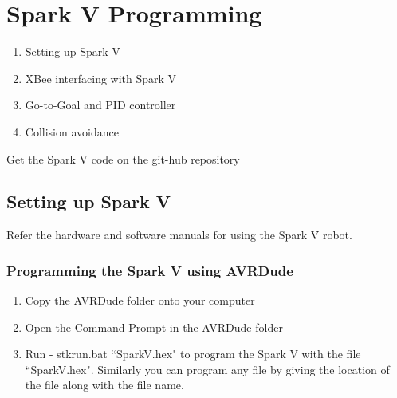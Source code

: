 \documentclass[main.tex]{subfiles}
\begin{document}
\chapter[Spark V Programming]{Spark V Programming}
	\begin{enumerate}
		\item Setting up Spark V
		\item XBee interfacing with Spark V
		\item Go-to-Goal and PID controller
		\item Collision avoidance
	\end{enumerate}

Get the Spark V code on the git-hub repository \href{https://github.com/eYSIP-2017/eYSIP-2017_Formation_Control_of_Multiple_Swarm_Robots}{\ExternalLink}

	\section{Setting up Spark V}
	
	Refer the hardware \href{./datasheet/Spark V manuals/SPARK V ATMEGA16 Hardware Manual 2010-11-06.pdf}{\ExternalLink} and software \href{./datasheet/Spark V manuals/SPARK V ATMEGA16 Hardware Manual 2010-11-06.pdf}{\ExternalLink} manuals for using the Spark V robot.
		
		\subsection{Programming the Spark V using AVRDude}
			\begin{enumerate}
				\item Copy the AVRDude folder onto your computer
				\item Open the Command Prompt in the AVRDude folder
				\item Run - stkrun.bat ``SparkV.hex"   to program the Spark V with the file ``SparkV.hex".
					  Similarly you can program any file by giving the location of the file along with the file name.
			\end{enumerate}
		
\end{document}
